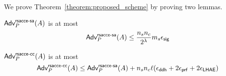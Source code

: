 We prove Theorem~\ref{theorem:proposed_scheme} by proving two lemmas.

\begin{lemma} \label{lemma:proposed_scheme_rsacce-sa}
 $\mathsf{Adv}^{\mathsf{rsacce\textsc{-} sa}}_{P}(A)$ is at most
 \begin{equation}
  \mathsf{Adv}^{\mathsf{rsacce\textsc{-} sa}}_{P}(A) \leq \frac{n_s n_c}{2^{\lambda}} m_s \epsilon_{\mathsf{sig}}
 \end{equation}
\end{lemma}
%


\begin{lemma} \label{lemma:proposed_scheme_rsacce-cc}
 $\mathsf{Adv}^{\mathsf{rsacce\textsc{-} cc}}_{P}(A)$ is at most
 \begin{equation}
  \mathsf{Adv}^{\mathsf{rsacce\textsc{-} cc}}_{P}(A) \leq \mathsf{Adv}^{\mathsf{rsacce\textsc{-} sa}}_{P}(A) + n_sn_c\ell(\epsilon_{\mathsf{ddh}} + 2\epsilon_{\mathsf{prf}} + 2\epsilon_{\mathsf{LHAE}})
 \end{equation}
\end{lemma}
%
